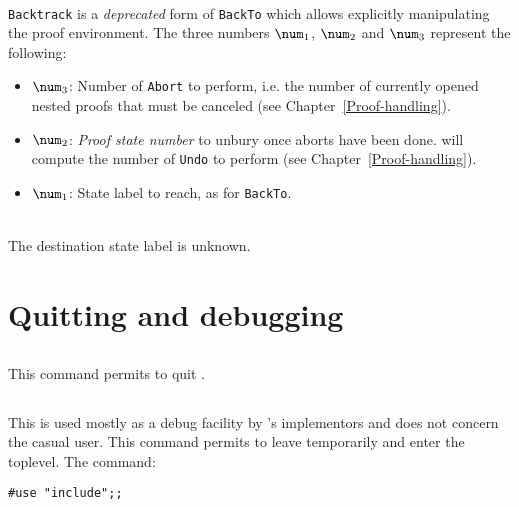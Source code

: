 \begin{Variants}
\item {}\\
  {\tt Backtrack} is a \emph{deprecated} form of {\tt BackTo} which
  allows explicitly manipulating the proof environment. The three
  numbers $\num_1$, $\num_2$ and $\num_3$ represent the following:
\begin{itemize}
\item $\num_3$: Number of \texttt{Abort} to perform, i.e. the number
  of currently opened nested proofs that must be canceled (see
  Chapter~\ref{Proof-handling}).
\item $\num_2$: \emph{Proof state number} to unbury once aborts have
  been done. {\Coq} will compute the number of \texttt{Undo} to perform
  (see Chapter~\ref{Proof-handling}).
\item $\num_1$: State label to reach, as for {\tt BackTo}.
\end{itemize}
\end{Variants}

\begin{ErrMsgs}
\item {} \\
  The destination state label is unknown.
\end{ErrMsgs}

\section{Quitting and debugging}

\subsection[\tt Quit.]{}
This command permits to quit \Coq.

\subsection[\tt Drop.]{}

This is used mostly as a debug facility by \Coq's implementors
and does not concern the casual user.
This command permits to leave {\Coq} temporarily and enter the
{\ocaml} toplevel. The {\ocaml} command:

\begin{flushleft}
\begin{verbatim}
#use "include";;
\end{verbatim}
\end{flushleft}

